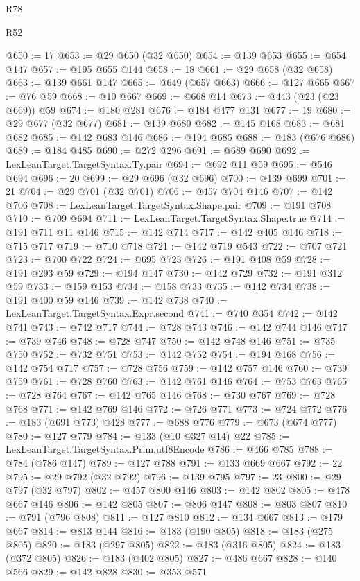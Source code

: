 \begin{lexlean}{R78}
\begin{lexlean}{R52}
\begin{coremodule}
{{{{{{{{{{{{{{{{{{{{{{{{{{{{{{{{{{{{{{{{{{{{{{{{{{{{{{{{{{{{{{{{{{{{{{{{{{{{{{{{{{{{{{{{{{{{{{{{{{{{{{{{{{{{{{{{{{{{{{{{{{{{{{{{{{{{{{{{{{{{{{{{{{{{{{{{{{{{{{{{{{{{{{{{{{{{{{{{{{{{{{{{{{{{{{{{{{{{{{@650 := 17
@653 := @29 @650 (@32 @650)
@654 := @139 @653
@655 := @654 @147
@657 := @195 @655 @144
@658 := 18
@661 := @29 @658 (@32 @658)
@663 := @139 @661 @147
@665 := @649 (@657 @663)
@666 := @127 @665
@667 := @76 @59
@668 := @10 @667
@669 := @668 @14
@673 := @443 (@23 (@23 @669)) @59
@674 := @180 @281
@676 := @184 @477 @131
@677 := 19
@680 := @29 @677 (@32 @677)
@681 := @139 @680
@682 := @145 @168
@683 := @681 @682
@685 := @142 @683 @146
@686 := @194 @685
@688 := @183 (@676 @686)
@689 := @184 @485
@690 := @272 @296
@691 := @689 @690
@692 := LexLeanTarget.TargetSyntax.Ty.pair
@694 := @692 @11 @59
@695 := @546 @694
@696 := 20
@699 := @29 @696 (@32 @696)
@700 := @139 @699
@701 := 21
@704 := @29 @701 (@32 @701)
@706 := @457 @704 @146
@707 := @142 @706
@708 := LexLeanTarget.TargetSyntax.Shape.pair
@709 := @191 @708
@710 := @709 @694
@711 := LexLeanTarget.TargetSyntax.Shape.true
@714 := @191 @711 @11 @146
@715 := @142 @714
@717 := @142 @405 @146
@718 := @715 @717
@719 := @710 @718
@721 := @142 @719 @543
@722 := @707 @721
@723 := @700 @722
@724 := @695 @723
@726 := @191 @408 @59
@728 := @191 @293 @59
@729 := @194 @147
@730 := @142 @729
@732 := @191 @312 @59
@733 := @159 @153
@734 := @158 @733
@735 := @142 @734
@738 := @191 @400 @59 @146
@739 := @142 @738
@740 := LexLeanTarget.TargetSyntax.Expr.second
@741 := @740 @354
@742 := @142 @741
@743 := @742 @717
@744 := @728 @743
@746 := @142 @744 @146
@747 := @739 @746
@748 := @728 @747
@750 := @142 @748 @146
@751 := @735 @750
@752 := @732 @751
@753 := @142 @752
@754 := @194 @168
@756 := @142 @754 @717
@757 := @728 @756
@759 := @142 @757 @146
@760 := @739 @759
@761 := @728 @760
@763 := @142 @761 @146
@764 := @753 @763
@765 := @728 @764
@767 := @142 @765 @146
@768 := @730 @767
@769 := @728 @768
@771 := @142 @769 @146
@772 := @726 @771
@773 := @724 @772
@776 := @183 (@691 @773) @428
@777 := @688 @776
@779 := @673 (@674 @777)
@780 := @127 @779
@784 := @133 (@10 @327 @14) @22
@785 := LexLeanTarget.TargetSyntax.Prim.utf8Encode
@786 := @466 @785
@788 := @784 (@786 @147)
@789 := @127 @788
@791 := @133 @669 @667
@792 := 22
@795 := @29 @792 (@32 @792)
@796 := @139 @795
@797 := 23
@800 := @29 @797 (@32 @797)
@802 := @457 @800 @146
@803 := @142 @802
@805 := @478 @667 @146
@806 := @142 @805
@807 := @806 @147
@808 := @803 @807
@810 := @791 (@796 @808)
@811 := @127 @810
@812 := @134 @667
@813 := @179 @667
@814 := @813 @144
@816 := @183 (@190 @805)
@818 := @183 (@275 @805)
@820 := @183 (@297 @805)
@822 := @183 (@316 @805)
@824 := @183 (@372 @805)
@826 := @183 (@402 @805)
@827 := @486 @667
@828 := @140 @566
@829 := @142 @828
@830 := @353 @571
}}}}}}}}}}}}}}}}}}}}}}}}}}}}}}}}}}}}}}}}}}}}}}}}}}}}}}}}}}}}}}}}}}}}}}}}}}}}}}}}}}}}}}}}}}}}}}}}}}}}}}}}}}}}}}}}}}}}}}}}}}}}}}}}}}}}}}}}}}}}}}}}}}}}}}}}}}}}}}}}}}}}}}}}}}}}}}}}}}}}}}}}}}}}}}}}}}}}}}
\end{coremodule}
\end{lexlean}
\end{lexlean}
